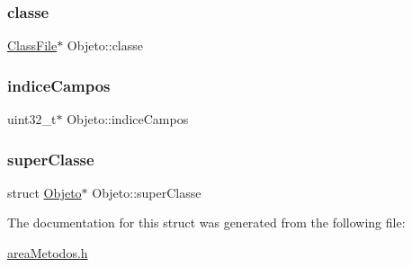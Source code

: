 \mbox{\label{structObjeto_a5596a470c07ffff562f21911fc34fbf3}} 
\subsubsection{\texorpdfstring{classe}{classe}}
{\footnotesize\ttfamily \hyperlink{structClassFile}{Class\+File}$\ast$ Objeto\+::classe}

\mbox{\label{structObjeto_a7561a3d822608137d47d2babf2dd9048}} 
\subsubsection{\texorpdfstring{indice\+Campos}{indiceCampos}}
{\footnotesize\ttfamily uint32\+\_\+t$\ast$ Objeto\+::indice\+Campos}

\mbox{\label{structObjeto_aa7b097e2dea86e221a2c7fc1c85b6fe5}} 
\subsubsection{\texorpdfstring{super\+Classe}{superClasse}}
{\footnotesize\ttfamily struct \hyperlink{structObjeto}{Objeto}$\ast$ Objeto\+::super\+Classe}



The documentation for this struct was generated from the following file\+:\begin{DoxyCompactItemize}
\item 
\hyperlink{areaMetodos_8h}{area\+Metodos.\+h}\end{DoxyCompactItemize}
